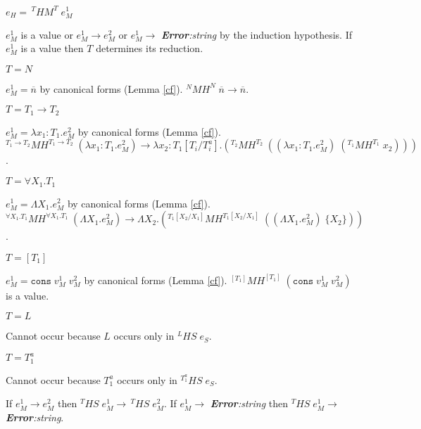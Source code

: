 \begin{case}
$e_{H}=\,^{T}HM^{T}\;e_{M}^{1}$

$e_{M}^{1}$ is a value or $e_{M}^{1}\rightarrow e_{M}^{2}$ or $e_{M}^{1}\rightarrow$ \emph{\textbf{Error}:\;string} by the induction hypothesis.  If $e_{M}^{1}$ is a value then $T$ determines its reduction.
\begin{subcase}
$T=N$

$e_{M}^{1}=\overline{n}$ by canonical forms (Lemma \ref{cf}).  $^{N}MH^{N}\;\overline{n}\rightarrow\overline{n}$.
\end{subcase}
\begin{subcase}
$T=T_{1}\rightarrow T_{2}$

$e_{M}^{1}=\lambda x_{1}:T_{1}.e_{M}^{2}$ by canonical forms (Lemma \ref{cf}).  $^{T_{1}\rightarrow T_{2}}MH^{T_{1}\rightarrow T_{2}}\;(\lambda x_{1}:T_{1}.e_{M}^{2})\rightarrow\lambda x_{2}:T_{1}[T_{i}/T^{a}_{i}].(^{T_{2}}MH^{T_{2}}\;((\lambda x_{1}:T_{1}.e_{M}^{2})\;(^{T_{1}}MH^{T_{1}}\;x_{2})))$.
\end{subcase}
\begin{subcase}
$T=\forall X_{1}.T_{1}$

$e_{M}^{1}=\Lambda X_{1}.e_{M}^{2}$ by canonical forms (Lemma \ref{cf}).  $^{\forall X_{1}.T_{1}}MH^{\forall X_{1}.T_{1}}\;(\Lambda X_{1}.e_{M}^{2})\rightarrow\Lambda X_{2}.(^{T_{1}[X_{2}/X_{1}]}MH^{T_{1}[X_{2}/X_{1}]}\;((\Lambda X_{1}.e_{M}^{2})\;\lbrace X_{2}\rbrace))$.
\end{subcase}
\begin{subcase}
$T=[T_{1}]$

$e_{M}^{1}=\mathtt{cons}\;v_{M}^{1}\;v_{M}^{2}$ by canonical forms (Lemma \ref{cf}).  $^{[T_{1}]}MH^{[T_{1}]}\;(\mathtt{cons}\;v_{M}^{1}\;v_{M}^{2})$ is a value.
\end{subcase}
\begin{subcase}
$T=L$

Cannot occur because $L$ occurs only in $^{L}HS\;e_{S}$.
\end{subcase}
\begin{subcase}
$T=T_{1}^{a}$

Cannot occur because $T_{1}^{a}$ occurs only in $^{T_{1}^{a}}HS\;e_{S}$.
\end{subcase}
If $e_{M}^{1}\rightarrow e_{M}^{2}$ then $^{T}HS\;e_{M}^{1}\rightarrow\,^{T}HS\;e_{M}^{2}$.  If $e_{M}^{1}\rightarrow$ \emph{\textbf{Error}:\;string} then $^{T}HS\;e_{M}^{1}\rightarrow$ \emph{\textbf{Error}:\;string}.
\end{case}